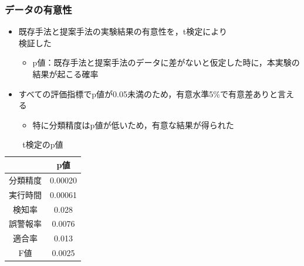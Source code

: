 \documentclass[11pt,dvipdfmx,cjk]{beamer}
\begin{document}
\begin{frame}
  \frametitle{データの有意性}
  \begin{itemize}
    \item 既存手法と提案手法の実験結果の有意性を，t検定により\\検証した
     \begin{itemize}
      \item  p値：既存手法と提案手法のデータに差がないと仮定した時に，本実験の結果が起こる確率
     \end{itemize}
    \item すべての評価指標でp値が0.05未満のため，有意水準5\%で有意差ありと言える
    \begin{itemize}
    \item 特に分類精度はp値が低いため，有意な結果が得られた
     \end{itemize}
  \end{itemize}
  \begin{table}[b]
    \centering
    \caption{t検定のp値}  %
    \begin{tabular}{|c|c|}  %
        \hline  %
        ~ & p値 \\
        \hline  %
        分類精度 & 0.00020\\
        \hline
        実行時間 &0.00061\\
        \hline  %
        検知率  & 0.028\\
        \hline  %
        誤警報率 &0.0076\\
        \hline 
        適合率 &0.013\\
        \hline
        F値 & 0.0025\\

        \hline
    \end{tabular}
  \end{table}
\end{frame}
\end{document}
